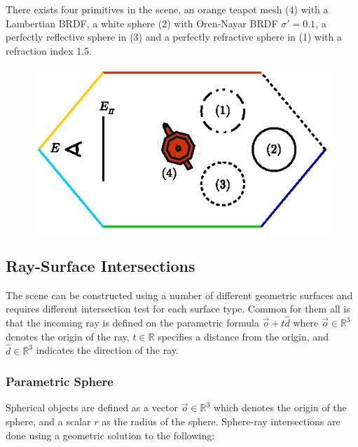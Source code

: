 \documentclass[a4paper, twocolumn]{article}
\begin{document}
        There exists four primitives in the scene, an orange teapot mesh (4) with a Lambertian BRDF, a white sphere (2) with Oren-Nayar BRDF \(\sigma' = 0.1\), a perfectly reflective sphere in (3) and a perfectly refractive sphere in (1) with a refraction index 1.5.

        \begin{figure}[ht]
            \centering
            \includegraphics[width=0.8\linewidth]{share/scene_description.eps}
            \label{fig:scene_description}
        \end{figure}

        \vspace{-1.5em}

        \clearpage

        \subsection{Ray-Surface Intersections} \label{sec:ray-surface_intersections}

        The scene can be constructed using a number of different geometric surfaces and requires different intersection test for each surface type. Common for them all is that the incoming ray is defined on the parametric formula \( \vec{o} + t \hat{d} \) where \( \vec{o} \in \mathbb{R}^3\) denotes the origin of the ray, \(t \in \mathbb{R}\) specifies a distance from the origin, and \(\hat{d} \in \mathbb{R}^3\) indicates the direction of the ray.
            
        \subsubsection{Parametric Sphere} \label{sec:parametric_sphere}
        
        Spherical objects are defined as a vector \(\vec{o} \in \mathbb{R}^3\) which denotes the origin of the sphere, and a scalar \(r\) as the radius of the sphere. Sphere-ray intersections are done using a geometric solution to the following:
\end{document}
